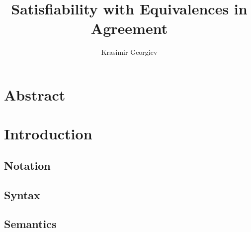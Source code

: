 \documentclass{scrbook}
\begin{document}
\frontmatter
\title{Satisfiability with Equivalences in Agreement}
\author{Krasimir Georgiev}
\maketitle
\tableofcontents
\printglossary[style=mcolindex]

\chapter{Abstract}


\mainmatter
\chapter{Introduction}\label{ch:intro}
\section{Notation}












\section{Syntax}







\section{Semantics}





\end{document}
